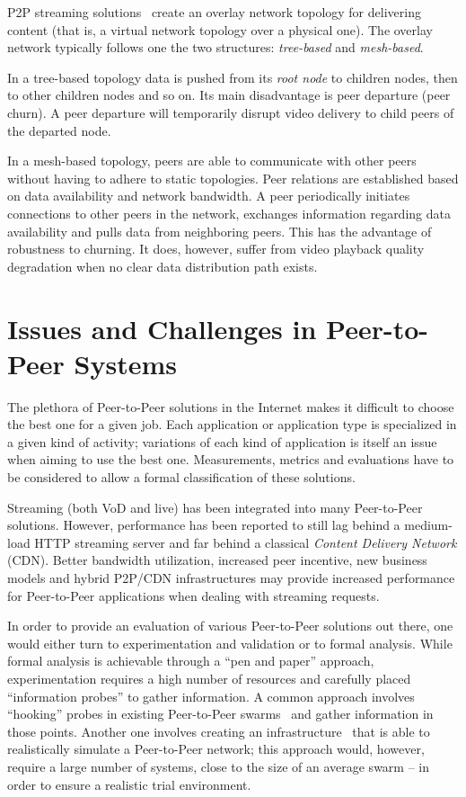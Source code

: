 P2P streaming solutions~\cite{p2p-streaming-survey} create an overlay network
topology for delivering content (that is, a virtual network topology over a
physical one).  The overlay network typically follows one the two structures:
\textit{tree-based} and \textit{mesh-based}.

In a tree-based topology data is pushed from its \textit{root node} to
children nodes, then to other children nodes and so on. Its main disadvantage
is peer departure (peer churn). A peer departure will temporarily
disrupt video delivery to child peers of the departed node.

In a mesh-based topology, peers are able to communicate with other peers without
having to adhere to static topologies. Peer relations are established based on
data availability and network bandwidth. A peer periodically initiates
connections to other peers in the network, exchanges information regarding
data availability and pulls data from neighboring peers. This has the
advantage of robustness to churning. It does, however, suffer from video
playback quality degradation when no clear data distribution path exists.

\section{Issues and Challenges in Peer-to-Peer Systems}
\label{sec:p2p-systems:issues}

The plethora of Peer-to-Peer solutions in the Internet makes it difficult to
choose the best one for a given job. Each application or application type is
specialized in a given kind of activity; variations of each kind of
application is itself an issue when aiming to use the best one. Measurements,
metrics and evaluations have to be considered to allow a formal classification
of these solutions.

Streaming (both VoD and live) has been integrated into many Peer-to-Peer
solutions.  However, performance has been reported to still lag behind a
medium-load HTTP streaming server and far behind a classical \textit{Content
Delivery Network} (CDN). Better bandwidth utilization, increased peer
incentive, new business models and hybrid P2P/CDN infrastructures may provide
increased performance for Peer-to-Peer applications when dealing with
streaming requests.

In order to provide an evaluation of various Peer-to-Peer solutions out there,
one would either turn to experimentation and validation or to formal
analysis. While formal analysis is achievable through a ``pen and paper''
approach, experimentation requires a high number of resources and carefully
placed ``information probes'' to gather information. A common approach
involves ``hooking'' probes in existing Peer-to-Peer
swarms~\cite{corr-overlay} and gather
information in those points. Another one involves creating an
infrastructure~\cite{bt-vi}
that is able to realistically simulate a Peer-to-Peer network; this approach
would, however, require a large number of systems, close to the size of an
average swarm -- in order to ensure a realistic trial environment.


